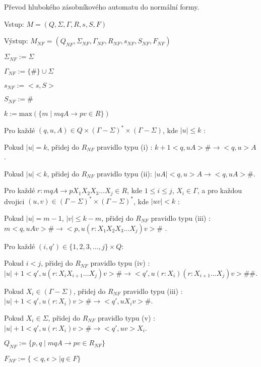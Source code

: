\begin{Alg}
Převod hlubokého zásobníkového automatu do normální formy.

\begin{list}{}{\setlength\parsep{0cm} \setlength\itemsep{0cm} \setlength\leftmargin{1em}}
   \item Vstup: $M = (Q,\Sigma,\Gamma, R, s, S, F)$ 
   \item Výstup: $M_{NF} = (Q_{NF}, \Sigma_{NF}, {\Gamma}_{NF}, R_{NF}, s_{NF},  S_{NF}, F_{NF})$ \medskip
  
  \item ${\Sigma}_{NF} := \Sigma$
  \item ${\Gamma}_{NF} :=\{\#\} \cup \Sigma$
  \item $s_{NF} := <s,S>$
  \item $S_{NF} := \#$ \medskip

  \item $k := \mathrm{max}(\{m \mid mqA \rightarrow pv \in R\}) $ \medskip

  \item Pro každé $(q,u,A) \in Q \times (\Gamma - \Sigma)^* \times (\Gamma - \Sigma)$, kde $|u| \le k$ : \medskip

  \subitem Pokud $|u| = k$, přidej do $R_{NF}$ pravidlo typu (i) :
  \subitem $k+1 <q,uA> \# \rightarrow <q,u> A$. \medskip

  \subitem Pokud $|u| < k$, přidej do $R_{NF}$ pravidlo typu (ii):
  \subitem $|uA| <q,u> A \rightarrow <q,uA> \#$. \medskip

  \item Pro každé $r : mqA \rightarrow p X_1 X_2 X_3 \dots X_j \in R$, kde $1 \le i \le j$, $X_i \in \Gamma$, a 
        pro každou dvojici $(u,v) \in (\Gamma - \Sigma)^* \times (\Gamma - \Sigma)^*$, kde $|uv| < k$ : \medskip

  \subitem Pokud $|u| = m - 1$, $|v| \le k-m$, přidej do $R_{NF}$ pravidlo typu (iii) :
  \subitem $m <q,uAv> \# \rightarrow <p,u (r : X_1 X_2 X_3 \dots X_j) v>\#$ . \medskip

  \subitem Pro každé $(i,q') \in \{1,2,3,\dots,j\} \times Q$: \medskip

  \subsubitem Pokud $i < j$, přidej do $R_{NF}$ pravidlo typu (iv) :
  \subsubitem $|u|+1 <q',u(r : X_i X_{i+1} \dots X_j)v> \# \rightarrow <q',u(r : X_i) (r: X_{i+1} \dots X_j)v> \#\# $. \medskip

  \subsubitem Pokud $X_i \in (\Gamma - \Sigma)$, přidej do $R_{NF}$ pravidlo typu (iii) :
  \subsubitem $|u|+1 <q',u (r : X_i) v> \# \rightarrow <q',u X_i v> \# $. \medskip

  \subsubitem Pokud $X_i \in \Sigma$, přidej do $R_{NF}$ pravidlo typu (v) :
  \subsubitem $|u|+1 <q',u (r : X_i) v> \# \rightarrow <q',uv> X_i $. \bigskip

  \item $Q_{NF} := \{p,q \mid mqA \rightarrow pv \in R_{NF}\} $
  \item $F_{NF} := \{<q, \epsilon> \mid  q \in F \}$


\end{list}
\end{Alg}


